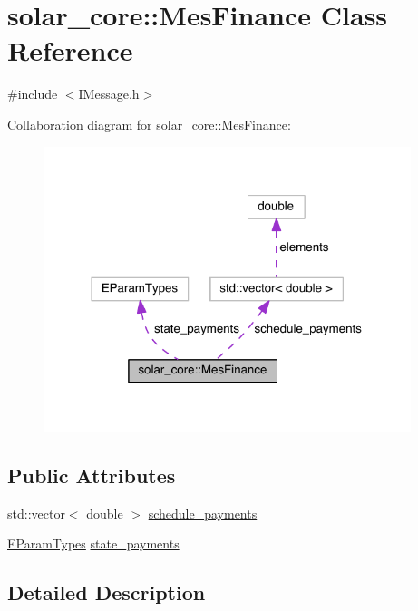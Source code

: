 \hypertarget{classsolar__core_1_1_mes_finance}{}\section{solar\+\_\+core\+:\+:Mes\+Finance Class Reference}
\label{classsolar__core_1_1_mes_finance}


{\ttfamily \#include $<$I\+Message.\+h$>$}



Collaboration diagram for solar\+\_\+core\+:\+:Mes\+Finance\+:\nopagebreak
\begin{figure}[H]
\begin{center}
\leavevmode
\includegraphics[width=304pt]{classsolar__core_1_1_mes_finance__coll__graph}
\end{center}
\end{figure}
\subsection*{Public Attributes}
\begin{DoxyCompactItemize}
\item 
std\+::vector$<$ double $>$ \hyperlink{classsolar__core_1_1_mes_finance_aa5f0c5370821ad09da5aea0da9c03a29}{schedule\+\_\+payments}
\item 
\hyperlink{namespacesolar__core_aa1147341e5ef7a40d68d1bd68e149362}{E\+Param\+Types} \hyperlink{classsolar__core_1_1_mes_finance_a5411785779f982be49c7e14584ce2fe2}{state\+\_\+payments}
\end{DoxyCompactItemize}


\subsection{Detailed Description}


